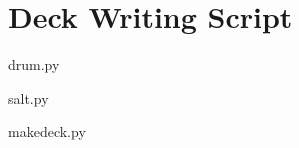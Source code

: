 \chapter{Deck Writing Script}

\begin{code}\caption{drum.py}
    \label{code:drum}\end{code}

\begin{code}\caption{salt.py}
    \label{code:salt}\end{code}

\begin{code}\caption{makedeck.py}
    \label{code:makedeck}\end{code}
